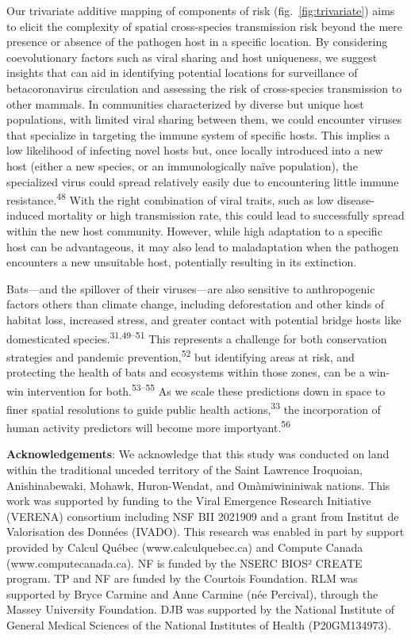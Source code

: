 \documentclass[10pt,oneside]{article}
\begin{document}
Our trivariate additive mapping of components of risk
(fig.~\ref{fig:trivariate}) aims to elicit the complexity of spatial
cross-species transmission risk beyond the mere presence or absence of
the pathogen host in a specific location. By considering coevolutionary
factors such as viral sharing and host uniqueness, we suggest insights
that can aid in identifying potential locations for surveillance of
betacoronavirus circulation and assessing the risk of cross-species
transmission to other mammals. In communities characterized by diverse
but unique host populations, with limited viral sharing between them, we
could encounter viruses that specialize in targeting the immune system
of specific hosts. This implies a low likelihood of infecting novel
hosts but, once locally introduced into a new host (either a new
species, or an immunologically naïve population), the specialized virus
could spread relatively easily due to encountering little immune
resistance.\textsuperscript{48} With the right combination of viral
traits, such as low disease-induced mortality or high transmission rate,
this could lead to successfully spread within the new host community.
However, while high adaptation to a specific host can be advantageous,
it may also lead to maladaptation when the pathogen encounters a new
unsuitable host, potentially resulting in its extinction.

Bats---and the spillover of their viruses---are also sensitive to
anthropogenic factors others than climate change, including
deforestation and other kinds of habitat loss, increased stress, and
greater contact with potential bridge hosts like domesticated
species.\textsuperscript{31,49--51} This represents a challenge for both
conservation strategies and pandemic prevention,\textsuperscript{52} but
identifying areas at risk, and protecting the health of bats and
ecosystems within those zones, can be a win-win intervention for
both.\textsuperscript{53--55} As we scale these predictions down in
space to finer spatial resolutions to guide public health
actions,\textsuperscript{33} the incorporation of human activity
predictors will become more importyant.\textsuperscript{56}

\textbf{Acknowledgements}: We acknowledge that this study was conducted
on land within the traditional unceded territory of the Saint Lawrence
Iroquoian, Anishinabewaki, Mohawk, Huron-Wendat, and Omàmiwininiwak
nations. This work was supported by funding to the Viral Emergence
Research Initiative (VERENA) consortium including NSF BII 2021909 and a
grant from Institut de Valorisation des Données (IVADO). This research
was enabled in part by support provided by Calcul Québec
(www.calculquebec.ca) and Compute Canada (www.computecanada.ca). NF is
funded by the NSERC BIOS² CREATE program. TP and NF are funded by the
Courtois Foundation. RLM was supported by Bryce Carmine and Anne Carmine
(née Percival), through the Massey University Foundation. DJB was
supported by the National Institute of General Medical Sciences of the
National Institutes of Health (P20GM134973).
\end{document}
